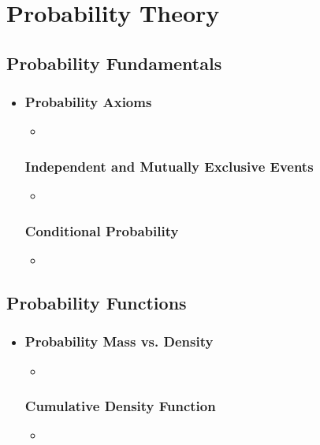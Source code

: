 \chapter{Probability Theory}

\section{Probability Fundamentals}
\begin{itemize}
  \item[]
  
  \subsection{Probability Axioms}
  \begin{itemize}
    \item 
  \end{itemize}

  \subsection{Independent and Mutually Exclusive Events}
  \begin{itemize}
    \item 
  \end{itemize}
  
  \subsection{Conditional Probability}
  \begin{itemize}
    \item 
  \end{itemize}
  
\end{itemize}

\section{Probability Functions}
\begin{itemize}
  \item []
  
  \subsection{Probability Mass vs. Density}
  \begin{itemize}
    \item 
  \end{itemize}

  \subsection{Cumulative Density Function}
  \begin{itemize}
    \item 
  \end{itemize}
  
\end{itemize}

